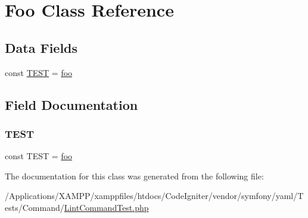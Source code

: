 \hypertarget{class_symfony_1_1_component_1_1_yaml_1_1_tests_1_1_command_1_1_foo}{}\section{Foo Class Reference}
\label{class_symfony_1_1_component_1_1_yaml_1_1_tests_1_1_command_1_1_foo}
\subsection*{Data Fields}
\begin{DoxyCompactItemize}
\item 
const \mbox{\hyperlink{class_symfony_1_1_component_1_1_yaml_1_1_tests_1_1_command_1_1_foo_a8d7759e13bc0c420f06a21e219e9da76}{T\+E\+ST}} = \textquotesingle{}\mbox{\hyperlink{interfacefoo}{foo}}\textquotesingle{}
\end{DoxyCompactItemize}


\subsection{Field Documentation}
\mbox{\label{class_symfony_1_1_component_1_1_yaml_1_1_tests_1_1_command_1_1_foo_a8d7759e13bc0c420f06a21e219e9da76}} 
\subsubsection{\texorpdfstring{T\+E\+ST}{TEST}}
{\footnotesize\ttfamily const T\+E\+ST = \textquotesingle{}\mbox{\hyperlink{interfacefoo}{foo}}\textquotesingle{}}



The documentation for this class was generated from the following file\+:\begin{DoxyCompactItemize}
\item 
/\+Applications/\+X\+A\+M\+P\+P/xamppfiles/htdocs/\+Code\+Igniter/vendor/symfony/yaml/\+Tests/\+Command/\mbox{\hyperlink{_lint_command_test_8php}{Lint\+Command\+Test.\+php}}\end{DoxyCompactItemize}
